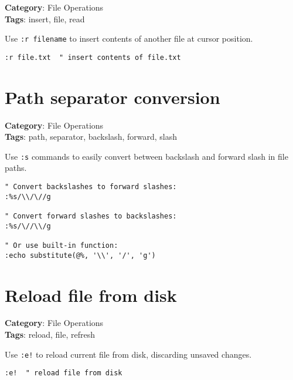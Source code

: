 {{{{{{\textbf{Category}: File Operations\\ \textbf{Tags}: insert, file, read
\vspace{0.5cm}

Use {\footnotesize \Verb§:r filename§} to insert contents of another file at cursor position.

\begin{Exa*}{}
\begin{Verbatim}[fontsize=\footnotesize, breaklines, breakanywhere]
:r file.txt  " insert contents of file.txt
\end{Verbatim}
\end{Exa*}

\section{Path separator conversion}

\textbf{Category}: File Operations\\ \textbf{Tags}: path, separator, backslash, forward, slash
\vspace{0.5cm}

Use {\footnotesize \Verb§:s§} commands to easily convert between backslash and forward slash in file paths.

\begin{Exa*}{}
\begin{Verbatim}[fontsize=\footnotesize, breaklines, breakanywhere]
" Convert backslashes to forward slashes:
:%s/\\/\//g

" Convert forward slashes to backslashes:
:%s/\//\\/g

" Or use built-in function:
:echo substitute(@%, '\\', '/', 'g')
\end{Verbatim}
\end{Exa*}

\section{Reload file from disk}

\textbf{Category}: File Operations\\ \textbf{Tags}: reload, file, refresh
\vspace{0.5cm}

Use {\footnotesize \Verb§:e!§} to reload current file from disk, discarding unsaved changes.

\begin{Exa*}{}
\begin{Verbatim}[fontsize=\footnotesize, breaklines, breakanywhere]
:e!  " reload file from disk
\end{Verbatim}
\end{Exa*}

}}}}}}
